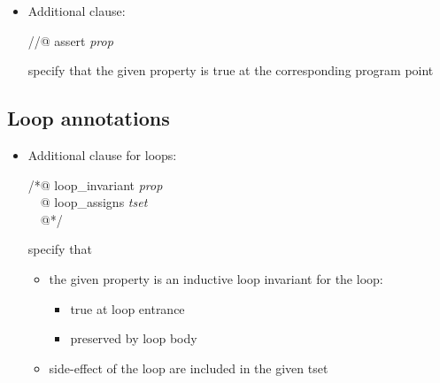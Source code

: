\documentclass[a4paper,11pt,twoside,openright]{report}
\begin{document}
  \begin{itemize}
  \item Additional clause:
    \begin{flushleft}\ttfamily\color{blue}
      //@ assert \textsl{prop}
    \end{flushleft}
  specify that the given property is true at the corresponding
    program point

  \end{itemize}

\subsection{Loop annotations}

  \begin{itemize}
  \item Additional clause for loops:
    \begin{flushleft}\ttfamily\color{blue}
      /*@ loop\_invariant \textsl{prop} \\
      ~~@ loop\_assigns \textsl{tset} \\
      ~~@*/
    \end{flushleft}
    specify that
    \begin{itemize}
    \item the given property is an inductive loop invariant for the
      loop:
      \begin{itemize}
      \item true at loop entrance
      \item preserved by loop body
      \end{itemize}
    \item side-effect of the loop are included in the given tset
    \end{itemize}
  \end{itemize}

\end{document}
